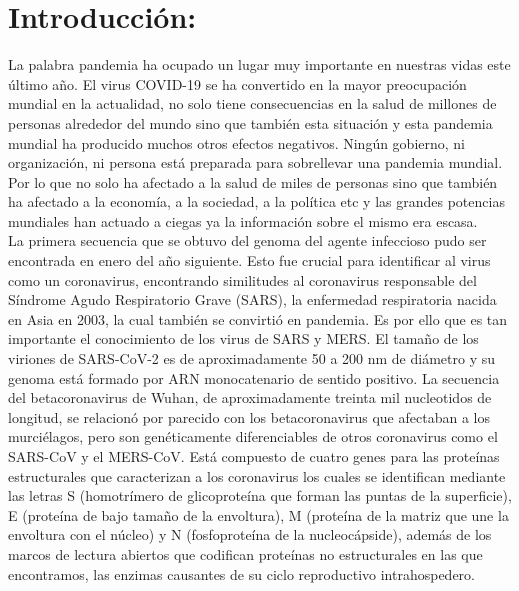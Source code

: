 \documentclass{article}
\begin{document}
	
	\section{Introducción:}
		La palabra pandemia ha ocupado un lugar muy importante en nuestras vidas este último año. El virus COVID-19 se ha convertido en la mayor preocupación mundial en la actualidad, no solo tiene consecuencias en la salud de millones de personas alrededor del mundo sino que también esta situación y esta pandemia mundial ha producido muchos otros efectos negativos. Ningún gobierno, ni organización, ni persona está preparada para sobrellevar una pandemia mundial. Por lo que no solo ha afectado a la salud de miles de personas sino que también ha afectado a la economía, a la sociedad, a la política etc y las grandes potencias mundiales han actuado a ciegas ya la información sobre el mismo era escasa.\\
		
		\noindent La primera secuencia que se obtuvo del genoma del agente infeccioso pudo ser encontrada en enero del año siguiente. Esto fue crucial para identificar al virus como un coronavirus, encontrando similitudes al coronavirus responsable del Síndrome Agudo Respiratorio Grave (SARS), la enfermedad respiratoria nacida en Asia en 2003, la cual también se convirtió en pandemia. Es por ello que es tan importante el conocimiento de los virus de SARS y MERS. El tamaño de los viriones de SARS-CoV-2 es de aproximadamente 50 a 200 nm de diámetro y su genoma está formado por ARN monocatenario de sentido positivo. La secuencia del betacoronavirus de Wuhan, de aproximadamente treinta mil nucleotidos de longitud, se relacionó por parecido con los betacoronavirus que afectaban a los murciélagos, pero son genéticamente diferenciables de otros coronavirus como el SARS-CoV y el MERS-CoV.  Está compuesto de cuatro genes para las proteínas estructurales que caracterizan a los coronavirus los cuales se identifican mediante las letras S (homotrímero de glicoproteína que forman las puntas de la superficie), E (proteína de bajo tamaño de la envoltura), M (proteína de la matriz que une la envoltura con el núcleo) y N (fosfoproteína de la nucleocápside), además de los marcos de lectura abiertos que codifican proteínas no estructurales en las que encontramos, las enzimas causantes de su ciclo reproductivo intrahospedero. \\
		
\end{document}
